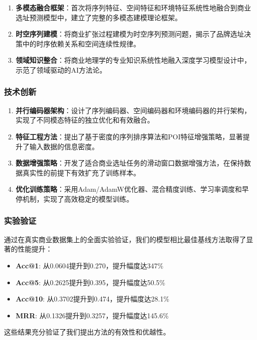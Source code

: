 \documentclass{article}
\begin{document}
\begin{enumerate}
\item \textbf{多模态融合框架}：首次将序列特征、空间特征和环境特征系统性地融合到商业选址预测模型中，建立了完整的多模态建模理论框架。
\item \textbf{时空序列建模}：将商业扩张过程建模为时空序列预测问题，揭示了品牌选址决策中的时序依赖关系和空间连续性规律。
\item \textbf{领域知识整合}：将商业地理学的专业知识系统性地融入深度学习模型设计中，示范了领域驱动的AI方法论。
\end{enumerate}

\subsubsection{技术创新}

\begin{enumerate}
\item \textbf{并行编码器架构}：设计了序列编码器、空间编码器和环境编码器的并行架构，实现了不同模态特征的独立优化和有效融合。
\item \textbf{特征工程方法}：提出了基于密度的序列排序算法和POI特征增强策略，显著提升了输入数据的信息密度。
\item \textbf{数据增强策略}：开发了适合商业选址任务的滑动窗口数据增强方法，在保持数据真实性的前提下有效扩充了训练样本。
\item \textbf{优化训练策略}：采用Adam/AdamW优化器、混合精度训练、学习率调度和早停机制，实现了高效稳定的模型训练。
\end{enumerate}

\subsubsection{实验验证}

通过在真实商业数据集上的全面实验验证，我们的模型相比最佳基线方法取得了显著的性能提升：

\begin{itemize}
\item \textbf{Acc@1}: 从0.0604提升到0.270，提升幅度达347\%
\item \textbf{Acc@5}: 从0.2625提升到0.395，提升幅度达50.5\%
\item \textbf{Acc@10}: 从0.3702提升到0.474，提升幅度达28.1\%
\item \textbf{MRR}: 从0.1326提升到0.3257，提升幅度达145.6\%
\end{itemize}

这些结果充分验证了我们提出方法的有效性和优越性。
\end{document}
